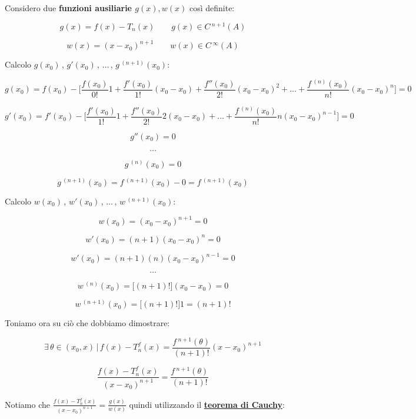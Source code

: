 \documentclass[../dimostrazioni]{subfiles}
\begin{document}
            \medskip

            Considero due \textbf{funzioni ausiliarie \(g(x), w(x)\)} così definite:

            \[  g(x) = f(x) - T_n (x) \qquad g(x) \in C\,^{n+1} (A)  \]

            \[  w(x) = (x - x_0)^{n+1} \qquad w(x) \in C\,^{\infty} (A)  \] 

            Calcolo \( g(x_0)\, , \, g'(x_0)\, ,\, \dots\, , \, g \,^{(n+1)}(x_0)  \):
            
            \[  g(x_0) = f(x_0) - \bigg[\frac{f(x_0)}{0!}1 + \frac{f'(x_0)}{1!}(x_0-x_0) + \frac{f''(x_0)}{2!}(x_0-x_0)^2 + \dots + \frac{f\,^{(n)}(x_0)}{n!}(x_0-x_0)^n \bigg] = 0\]

            \[  g'(x_0) = f'(x_0) - \bigg[\frac{f'(x_0)}{1!}1 + \frac{f''(x_0)}{2!}2(x_0-x_0) + \dots + \frac{f\,^{(n)}(x_0)}{n!}n(x_0-x_0)^{n-1} \bigg] = 0 \]
    
            \[  g''(x_0) = 0    \]
            
            \[  \dots \]

            \[  g\,^{(n)} (x_0) = 0   \]

            \[  g\,^{(n+1)} (x_0) = f\,^{(n+1)}(x_0) - 0 = f\,^{(n+1)}(x_0)   \]
            
            Calcolo \( w(x_0)\, , \, w'(x_0)\, ,\, \dots\, , \, w \,^{(n+1)}(x_0)  \):

            \[  w(x_0) = (x_0 - x_0)^{n+1} = 0  \]

            \[  w'(x_0) = (n+1)(x_0 - x_0)^{n} = 0  \]

            \[  w'(x_0) = (n+1)(n)(x_0 - x_0)^{n-1} = 0  \]

            \[  \dots \]

            \[  w\,^{(n)} (x_0) = \big[(n+1)!\big](x_0 - x_0) = 0   \]

            \[  w\,^{(n+1)} (x_0) = \big[(n+1)!\big] 1 = (n+1)!   \]

            Toniamo ora su ciò che dobbiamo dimostrare:

            \[  \exists \, \theta \in (x_0, x) \, | \, f(x) - T _n ^ f (x) = \frac{f\,^{n+1}(\theta)}{(n+1)!}(x-x_0)^{n+1} \]

            \[  \frac{f(x) - T _n ^ f (x)}{(x-x_0)^{n+1}} = \frac{f\,^{n+1}(\theta)}{(n+1)!}    \]

            Notiamo che \(  \frac{f(x) - T _n ^ f (x)}{(x-x_0)^{n+1}} = \frac{g(x)}{w(x)}    \) quindi utilizzando il \textbf{\hyperref[teoCauchy]{teorema di Cauchy}}:
\end{document}
